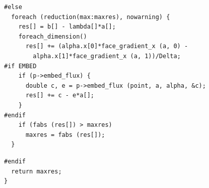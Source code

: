 \documentclass[a4paper]{article}
\begin{document}
\begin{center}
\end{center}

\begin{multicols}{2}
  \columnbreak
  \begin{verbatim}
#else
  foreach (reduction(max:maxres), nowarning) {
    res[] = b[] - lambda[]*a[];
    foreach_dimension()
      res[] += (alpha.x[0]*face_gradient_x (a, 0) -
		alpha.x[1]*face_gradient_x (a, 1))/Delta;  
#if EMBED
    if (p->embed_flux) {
      double c, e = p->embed_flux (point, a, alpha, &c);
      res[] += c - e*a[];
    }
#endif
    if (fabs (res[]) > maxres)
      maxres = fabs (res[]);
  }
  \end{verbatim}
\end{multicols}

\begin{center}
\end{center}

\begin{multicols}{2}
  \columnbreak
  \begin{verbatim}
#endif
  return maxres;
}
  \end{verbatim}
\end{multicols}
\printbibliography
\end{document}
